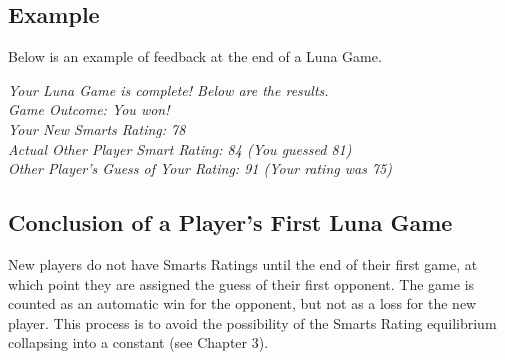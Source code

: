 \subsection{Example}
Below is an example of feedback at the end of a Luna Game.
\begin{center}
\textit{Your Luna Game is complete! Below are the results.}\\
\textit{Game Outcome: You won!}\\
\textit{Your New Smarts Rating: 78}\\
\textit{Actual Other Player Smart Rating: 84 (You guessed 81)}\\
\textit{Other Player's Guess of Your Rating: 91 (Your rating was 75)}
\end{center}

\subsection{Conclusion of a Player's First Luna Game}

New players do not have Smarts Ratings until the end of their first game, at which point they are assigned the guess of their first opponent. The game is counted as an automatic win for the opponent, but not as a loss for the new player. This process is to avoid the possibility of the Smarts Rating equilibrium collapsing into a constant (see Chapter 3).